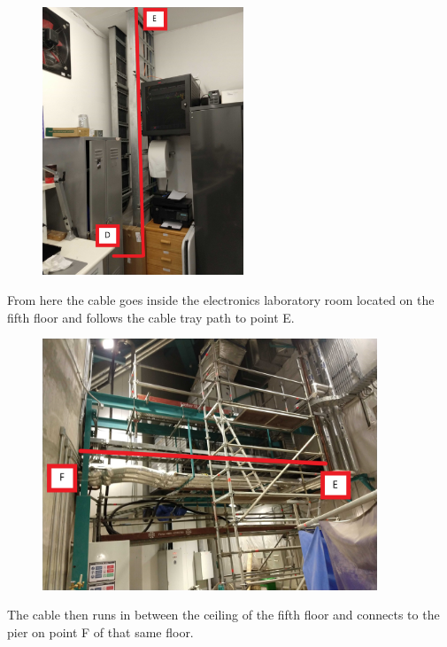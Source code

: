   
\newpage

  \begin{figure}
    \centering
    \includegraphics[width=6cm]{images/17.jpg}
  \end{figure}

From here the cable goes inside the electronics laboratory room located on the fifth floor and follows the cable tray path to point E.

  \begin{figure}
    \centering
    \includegraphics[width=10cm]{images/18.jpg}
  \end{figure}

The cable then runs in between the ceiling of the fifth floor and connects to the pier on point F of that same floor.

